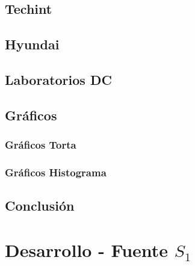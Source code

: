 \documentclass[final,narroweqnarray,inline]{ieee}
\begin{document}
  \subsection{Techint}

  \subsection{Hyundai}

  \subsection{Laboratorios DC}

  \subsection{Gráficos}
  \subsubsection*{Gráficos Torta}
  \subsubsection*{Gráficos Histograma}

  \subsection{Conclusión}

\newpage
\section{Desarrollo - Fuente $S_1$}
\end{document}
